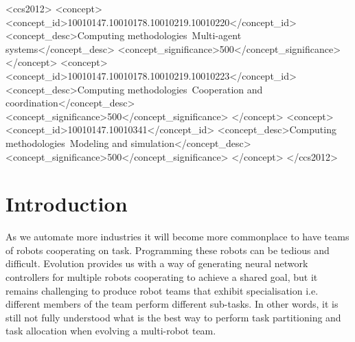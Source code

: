 \documentclass[sigconf]{aamas}  %
\begin{document}
\begin{CCSXML}
<ccs2012>
<concept>
<concept_id>10010147.10010178.10010219.10010220</concept_id>
<concept_desc>Computing methodologies~Multi-agent systems</concept_desc>
<concept_significance>500</concept_significance>
</concept>
<concept>
<concept_id>10010147.10010178.10010219.10010223</concept_id>
<concept_desc>Computing methodologies~Cooperation and coordination</concept_desc>
<concept_significance>500</concept_significance>
</concept>
<concept>
<concept_id>10010147.10010341</concept_id>
<concept_desc>Computing methodologies~Modeling and simulation</concept_desc>
<concept_significance>500</concept_significance>
</concept>
</ccs2012>
\end{CCSXML}




\maketitle



\section{Introduction}

As we automate more industries it will become more commonplace to have teams of robots cooperating on task. 
Programming these robots can be tedious and difficult. 
Evolution provides us with a way of generating neural network controllers for multiple robots cooperating to achieve a shared goal, but it remains challenging to produce robot teams that exhibit specialisation i.e. different members of the team perform different sub-tasks. 
In other words, it is still not fully understood what is the best way to perform task partitioning and task allocation when evolving a multi-robot team.
\end{document}
